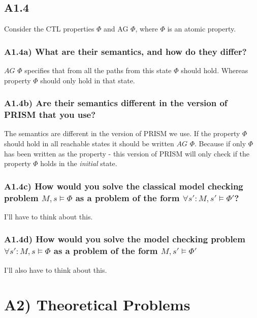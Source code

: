 \documentclass[12pt]{report}
\begin{document}
\subsection*{A1.4}
Consider the CTL properties $\Phi$ and AG $\Phi$, where $\Phi$ is an atomic property.

\subsubsection*{A1.4a) What are their semantics, and how do they differ?}
$AG$ $\Phi$ specifies that from all the paths from this state $\Phi$ should hold. Whereas property $\Phi$ should only hold in that state.

\subsubsection*{A1.4b) Are their semantics different in the version of PRISM that you use?}
The semantics are different in the version of PRISM we use. If the property $\Phi$ should hold in all reachable states it should be written $AG$ $\Phi$. Because if only $\Phi$ has been written as the property - this version of PRISM will only check if the property $\Phi$ holds in the \emph{initial} state.

\subsubsection*{A1.4c) How would you solve the classical model checking problem $M,s \models \Phi$ as a problem of the form $\forall s' : M,s' \models \Phi'$?}
I'll have to think about this.

\subsubsection*{A1.4d) How would you solve the model checking problem $\forall s' : M,s \models \Phi$ as a problem of the form $M,s' \models \Phi'$}
I'll also have to think about this.

\section*{A2) Theoretical Problems}
\end{document}
